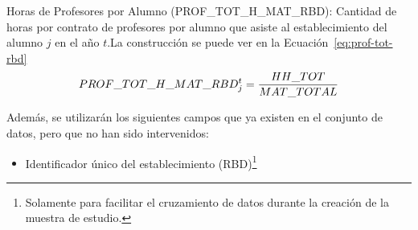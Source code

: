 \begin{longdescription}
\begin{longdescription}
                \item[Horas de Profesores por Alumno](PROF\_TOT\_H\_MAT\_RBD): Cantidad de horas por contrato de profesores por alumno que asiste al establecimiento del alumno $j$ en el año $t$.La construcción se puede ver en la Ecuación~\ref{eq:prof-tot-rbd}
                  \begin{equation}
                  \centering
                    PROF\_TOT\_H\_MAT\_RBD_{j}^{t} = \frac{HH\_TOT}{MAT\_TOTAL}
                    \label{eq:prof-tot-rbd}
                  \end{equation}
            \end{longdescription}
        Además, se utilizarán los siguientes campos que ya existen en el conjunto de datos, pero que no han sido intervenidos:
            \begin{itemize}
              \item Identificador único del establecimiento (RBD)\footnote{Solamente para facilitar el cruzamiento de datos durante la creación de la muestra de estudio.}
            \end{itemize}
        \end{longdescription}